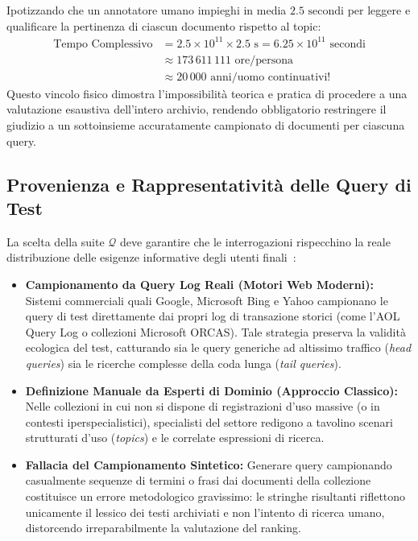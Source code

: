 Ipotizzando che un annotatore umano impieghi in media $2.5\text{ secondi}$ per leggere e qualificare la pertinenza di ciascun documento rispetto al topic:
\begin{align}
\text{Tempo Complessivo} &= 2.5 \times 10^{11} \times 2.5\text{ s} = 6.25 \times 10^{11}\text{ secondi} \nonumber \\
&\approx 173\,611\,111\text{ ore/persona} \nonumber \\
&\approx 20\,000\text{ anni/uomo continuativi!}
\end{align}
Questo vincolo fisico dimostra l'impossibilit\`a teorica e pratica di procedere a una valutazione esaustiva dell'intero archivio, rendendo obbligatorio restringere il giudizio a un sottoinsieme accuratamente campionato di documenti per ciascuna query.

\FloatBarrier
\subsection{Provenienza e Rappresentativit\`a delle Query di Test}
\label{subsec:provenienza-query-test}

La scelta della suite $\mathcal{Q}$ deve garantire che le interrogazioni rispecchino la reale distribuzione delle esigenze informative degli utenti finali~\cite{manning2008}:

\begin{itemize}
    \item \textbf{Campionamento da Query Log Reali (Motori Web Moderni):} Sistemi commerciali quali Google, Microsoft Bing e Yahoo campionano le query di test direttamente dai propri log di transazione storici (come l'AOL Query Log o collezioni Microsoft ORCAS). Tale strategia preserva la validit\`a ecologica del test, catturando sia le query generiche ad altissimo traffico (\textit{head queries}) sia le ricerche complesse della coda lunga (\textit{tail queries}).
    \item \textbf{Definizione Manuale da Esperti di Dominio (Approccio Classico):} Nelle collezioni in cui non si dispone di registrazioni d'uso massive (o in contesti iperspecialistici), specialisti del settore redigono a tavolino scenari strutturati d'uso (\textit{topics}) e le correlate espressioni di ricerca.
    \item \textbf{Fallacia del Campionamento Sintetico:} Generare query campionando casualmente sequenze di termini o frasi dai documenti della collezione costituisce un errore metodologico gravissimo: le stringhe risultanti riflettono unicamente il lessico dei testi archiviati e non l'intento di ricerca umano, distorcendo irreparabilmente la valutazione del ranking.
\end{itemize}

